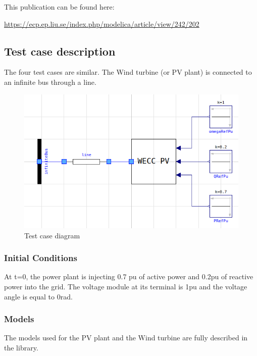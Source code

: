 \documentclass[a4paper, 12pt]{report}
\begin{document}
\par This publication can be found here:

\url{https://ecp.ep.liu.se/index.php/modelica/article/view/242/202}

\subsection{Test case description}

\par The four test cases are similar. The Wind turbine (or PV plant) is connected to an infinite bus through a line.

\begin{figure}[H]
  \includegraphics[width=\textwidth]{WECC.png}
  \caption{Test case diagram}
\end{figure}

\subsubsection{Initial Conditions}

\par At t=0, the power plant is injecting 0.7 pu of active power and 0.2pu of reactive power into the grid. The voltage module at its terminal is 1pu and the voltage angle is equal to 0rad.

\subsubsection{Models}

\par The models used for the PV plant and the Wind turbine are fully described in the \Dynawo library.
\end{document}

